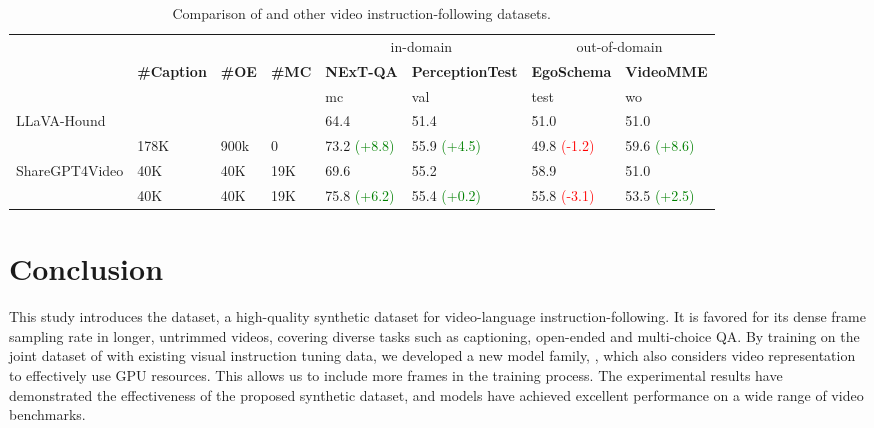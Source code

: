\begin{table}[t!]
\tabstyle{3pt}
\centering
\small
\caption{Comparison of \DataName{} and other video instruction-following datasets.}
\begin{tabular}{@{}llll|llll@{}}
    \toprule
       & & & & \multicolumn{2}{c}{in-domain} & \multicolumn{2}{c}{out-of-domain} \\   
     &
      \multirow{3}{*}{\textbf{\#Caption}} &
    \multirow{3}{*}{\textbf{\#OE}} &
    \multirow{3}{*}{\textbf{\#MC}} &
    \textbf{NExT-QA} & \textbf{PerceptionTest} & 
    \textbf{EgoSchema} & 
    \textbf{VideoMME} \\ \cmidrule(l){5-8} 
      & &  &   & mc & val  & test & wo \\ \midrule
    LLaVA-Hound & 900K & 900k & 0 & 64.4 & 51.4 & 51.0 & 51.0 \\  
    \DataName{} & 178K & 900k & 0 & 73.2 \textcolor{green}{\scriptsize (+8.8)} & 55.9 \textcolor{green}{\scriptsize (+4.5)} & 49.8 \textcolor{red}{\scriptsize (-1.2)} & 59.6 \textcolor{green}{\scriptsize (+8.6)} \\
  \midrule
    ShareGPT4Video & 40K & 40K & 19K & 69.6 & 55.2 & 58.9 & 51.0 \\  
    \DataName{} & 40K & 40K & 19K & 75.8 \textcolor{green}{\scriptsize (+6.2)} & 55.4 \textcolor{green}{\scriptsize (+0.2)} & 55.8 \textcolor{red}{\scriptsize (-3.1)} & 53.5 \textcolor{green}{\scriptsize (+2.5)} \\
    \bottomrule
    \end{tabular}%
\label{tab:dataset_comparison_exp}
\end{table}

\section{Conclusion}
This study introduces the \DataName{} dataset, a high-quality synthetic dataset for video-language instruction-following. It is favored for its dense frame sampling rate in longer, untrimmed videos, covering diverse tasks such as captioning, open-ended and multi-choice QA. By training on the joint dataset of \DataName{} with existing visual instruction tuning data, we developed a new model family, \ModelName{}, which also considers video representation to effectively use GPU resources. This allows us to include more frames in the training process. The experimental results have demonstrated the effectiveness of the proposed synthetic dataset, and \ModelName{} models have achieved excellent performance on a wide range of video benchmarks.

\clearpage

